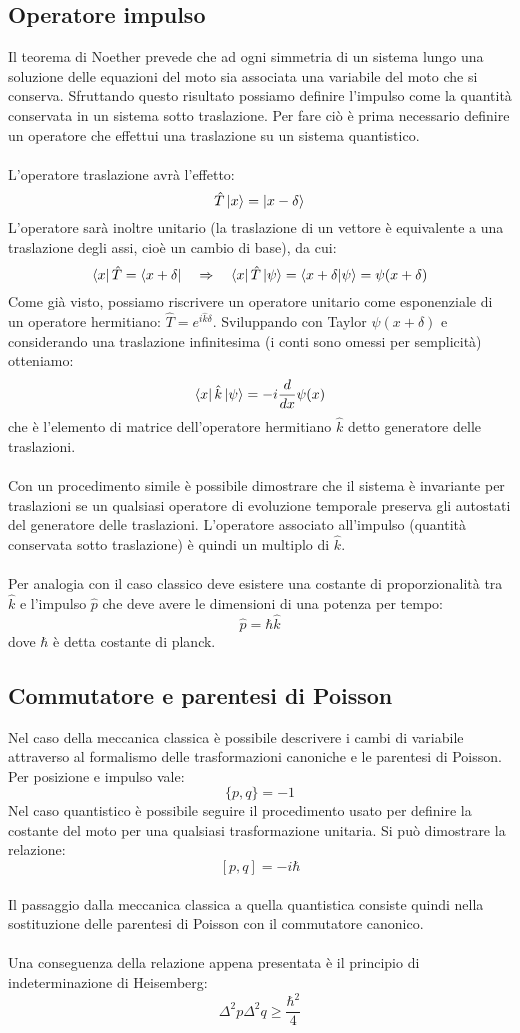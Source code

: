 \documentclass{article}
\begin{document}
\subsection{Operatore impulso}
Il teorema di Noether prevede che ad ogni simmetria di un sistema lungo una soluzione delle equazioni del moto sia associata una variabile del moto che si conserva. Sfruttando questo risultato possiamo definire l'impulso come la quantità conservata in un sistema sotto traslazione. Per fare ciò è prima necessario definire un operatore che effettui una traslazione su un sistema quantistico.\\\\
L'operatore traslazione avrà l'effetto:
$$ \hat{T}\ket{x}=\ket{x-\delta} $$
L'operatore sarà inoltre unitario (la traslazione di un vettore è equivalente a una traslazione degli assi, cioè un cambio di base), da cui:
$$ \bra{x}\hat{T}=\bra{x+\delta} \quad \Rightarrow \quad 
\bra{x}\hat{T}\ket{\psi}=\bra{x+\delta}\ket{\psi}=\psi(x+\delta)$$
Come già visto, possiamo riscrivere un operatore unitario come esponenziale di un operatore hermitiano: $\hat{T}=e^{i\hat{k}\delta}$. Sviluppando con Taylor $\psi(x+\delta)$ e considerando una traslazione infinitesima (i conti sono omessi per semplicità) otteniamo:
$$ \bra{x}\hat{k}\ket{\psi}=-i\frac{d}{dx}\psi(x) $$
che è l'elemento di matrice dell'operatore hermitiano $\hat{k}$ detto generatore delle traslazioni.\\\\
Con un procedimento simile è possibile dimostrare che il sistema è invariante per traslazioni se un qualsiasi operatore di evoluzione temporale preserva gli autostati del generatore delle traslazioni. L'operatore associato all'impulso (quantità conservata sotto traslazione) è quindi un multiplo di $\hat{k}$.\\\\
Per analogia con il caso classico deve esistere una costante di proporzionalità tra $\hat{k}$ e l'impulso $\hat{p}$ che deve avere le dimensioni di una potenza per tempo:
$$ \hat{p}=\hbar\hat{k} $$
dove $\hbar$ è detta costante di planck.

\subsection{Commutatore e parentesi di Poisson}
Nel caso della meccanica classica è possibile descrivere i cambi di variabile attraverso al formalismo delle trasformazioni canoniche e le parentesi di Poisson.  Per posizione e impulso vale:
$$\{p,q\}=-1$$
Nel caso quantistico è possibile seguire il procedimento usato per definire la costante del moto per una qualsiasi trasformazione unitaria. Si può dimostrare la relazione:
$$[p,q]=-i\hbar$$
\\Il passaggio dalla meccanica classica a quella quantistica consiste quindi nella sostituzione delle parentesi di Poisson con il commutatore canonico.\\\\
Una conseguenza della relazione appena presentata è il principio di indeterminazione di Heisemberg:
$$ \Delta^2p\Delta^2q\geq\frac{\hbar^2}{4} $$
\end{document}
